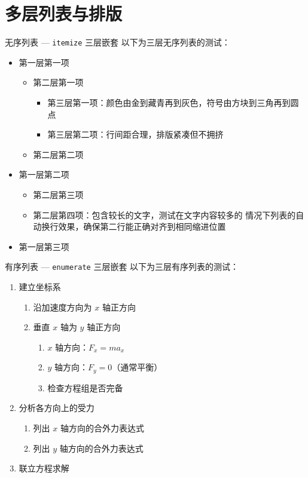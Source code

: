 \documentclass[darkmode=false, randomquote=true, quoteseed=2026, shownav=false,handout=false]{HiBeamer}
\begin{document}
\section{多层列表与排版}

\begin{frame}{无序列表 --- \texttt{itemize} 三层嵌套}
  以下为三层无序列表的测试：
  \begin{itemize}
    \item 第一层第一项
    \begin{itemize}
      \item 第二层第一项
      \begin{itemize}
        \item 第三层第一项：颜色由金到藏青再到灰色，符号由方块到三角再到圆点
        \item 第三层第二项：行间距合理，排版紧凑但不拥挤
      \end{itemize}
      \item 第二层第二项
    \end{itemize}
    \item 第一层第二项
    \begin{itemize}
      \item 第二层第三项
      \item 第二层第四项：包含较长的文字，测试在文字内容较多的
            情况下列表的自动换行效果，确保第二行能正确对齐到相同缩进位置
    \end{itemize}
    \item 第一层第三项
  \end{itemize}
\end{frame}

\begin{frame}{有序列表 --- \texttt{enumerate} 三层嵌套}
  以下为三层有序列表的测试：
  \begin{enumerate}
    \item 建立坐标系
    \begin{enumerate}
      \item 沿加速度方向为 $x$ 轴正方向
      \item 垂直 $x$ 轴为 $y$ 轴正方向
      \begin{enumerate}
        \item $x$ 轴方向：$F_x = ma_x$
        \item $y$ 轴方向：$F_y = 0$（通常平衡）
        \item 检查方程组是否完备
      \end{enumerate}
    \end{enumerate}
    \item 分析各方向上的受力
    \begin{enumerate}
      \item 列出 $x$ 轴方向的合外力表达式
      \item 列出 $y$ 轴方向的合外力表达式
    \end{enumerate}
    \item 联立方程求解
  \end{enumerate}
\end{frame}
\end{document}

